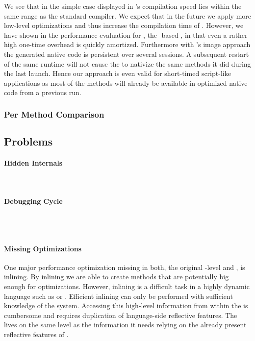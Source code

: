 We see that in the simple case displayed in  \NBJ's compilation speed lies within the same range as the standard \ST compiler.
We expect that in the future we apply more low-level optimizations and thus increase the compilation time of \NBJ.
However, we have shown in the performance evaluation for \NB, the \B-based \FFI, in  that even a rather high one-time overhead is quickly amortized.
Furthermore with \ST's image approach the generated native code is persistent over several sessions.
A subsequent restart of the same runtime will not cause the \JIT to nativize the same methods it did during the last launch.
Hence our approach is even valid for short-timed script-like applications as most of the methods will already be available in optimized native code from a previous run.

\subsubsection*{Per Method Comparison}


\subsection{Problems}
\paragraph{Hidden \VM Internals}
\\


\paragraph{Debugging Cycle}
 \\
 \\

\paragraph{Missing Optimizations}
One major performance optimization missing in both, the original \PH \VM-level \JIT and \NBJ, is inlining. 
By inlining we are able to create methods that are potentially big enough for optimizations.
However, inlining is a difficult task in a highly dynamic language such as \ST or \Self \cite{Cham89a}. 
Efficient inlining can only be performed with sufficient knowledge of the system. 
Accessing this high-level information from within the \VM is cumbersome and requires duplication of language-side reflective features.
The \JIT lives on the same level as the information it needs relying on the already present reflective features of \ST.


